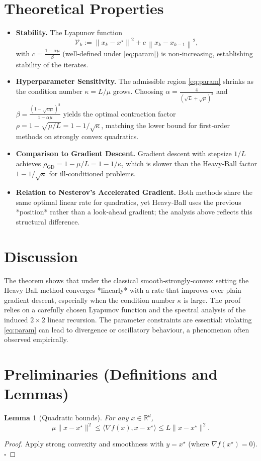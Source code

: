 \documentclass[11pt]{article}
\newtheorem{lemma}{Lemma}
\newcommand{\norm}[1]{\left\lVert#1\right\rVert}
\begin{document}
\section*{Theoretical Properties}
\begin{itemize}[leftmargin=*]
\item \textbf{Stability.} The Lyapunov function
\[
\mathcal{V}_k:=\norm{x_k-x^{\star}}^{2}+c\,\norm{x_k-x_{k-1}}^{2},
\]
with $c=\frac{1-\alpha\mu}{\beta}$ (well‑defined under \eqref{eq:param}) is non‑increasing, establishing stability of the iterates.
\item \textbf{Hyperparameter Sensitivity.} The admissible region \eqref{eq:param} shrinks as the condition number $\kappa=L/\mu$ grows. Choosing $\alpha=\frac{4}{(\sqrt{L}+\sqrt{\mu})^{2}}$ and $\beta=\frac{(1-\sqrt{\alpha\mu})^{2}}{1-\alpha\mu}$ yields the optimal contraction factor $\rho=1-\sqrt{\mu/L}=1-1/\sqrt{\kappa}$, matching the lower bound for first‑order methods on strongly convex quadratics.
\item \textbf{Comparison to Gradient Descent.} Gradient descent with stepsize $1/L$ achieves $\rho_{\text{GD}}=1-\mu/L=1-1/\kappa$, which is slower than the Heavy‑Ball factor $1-1/\sqrt{\kappa}$ for ill‑conditioned problems.
\item \textbf{Relation to Nesterov’s Accelerated Gradient.} Both methods share the same optimal linear rate for quadratics, yet Heavy‑Ball uses the previous *position* rather than a look‑ahead gradient; the analysis above reflects this structural difference.
\end{itemize}

\section*{Discussion}
The theorem shows that under the classical smooth‑strongly‑convex setting the Heavy‑Ball method converges *linearly* with a rate that improves over plain gradient descent, especially when the condition number $\kappa$ is large. The proof relies on a carefully chosen Lyapunov function and the spectral analysis of the induced $2\times2$ linear recursion. The parameter constraints are essential: violating \eqref{eq:param} can lead to divergence or oscillatory behaviour, a phenomenon often observed empirically.

\newpage
\section*{Preliminaries (Definitions and Lemmas)}
\begin{lemma}[Quadratic bounds]\label{lem:quad}
For any $x\in\mathbb{R}^d$,
\[
\mu\|x-x^{\star}\|^{2}\le \langle\nabla f(x),x-x^{\star}\rangle\le L\|x-x^{\star}\|^{2}.
\]
\end{lemma}
\begin{proof}
Apply strong convexity and smoothness with $y=x^{\star}$ (where $\nabla f(x^{\star})=0$). \hfill $\square$
\end{proof}
\end{document}
